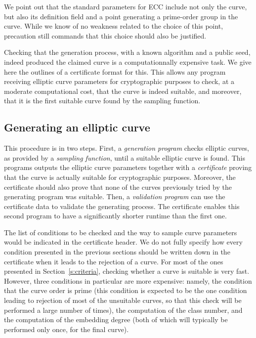 \documentclass[twocolumn,letterpaper,10pt]{article}
\begin{document}
We point out that the standard parameters for ECC
include not only the curve, but also its definition field
and a point generating a prime-order group in the curve.
While we know of no weakness related to the choice of this point,
precaution still commands that this choice should also be justified.


Checking that the generation process,
with a known algorithm and a public seed,
indeed produced the claimed curve
is a computationnally expensive task.
We give here the outlines of a certificate format for this.
This allows any program receiving elliptic curve parameters
for cryptographic purposes
to check, at a moderate computational cost,
that the curve is indeed suitable,
and moreover, that it is the first suitable curve
found by the sampling function.

\subsection{Generating an elliptic curve}

This procedure is in two steps.
First, a \emph{generation program}
checks elliptic curves, as provided by a \emph{sampling function},
until a suitable elliptic curve is found.
This programs outputs the elliptic curve parameters
together with a \emph{certificate} proving that
the curve is actually suitable for cryptographic purposes.
Moreover, the certificate should also prove that
none of the curves previously tried by the generating program
was suitable.
Then, a \emph{validation program} can use the certificate data
to validate the generating process.
The certificate enables this second program
to have a significantly shorter runtime than the first one.

The list of conditions to be checked and the way to sample
curve parameters would be indicated in the certificate header.
We do not fully specify how every condition presented
in the previous sections should be written down in the
certificate when it leads to the rejection of a curve.
For most of the ones presented in Section~\ref{s:criteria},
checking whether a curve is suitable is very fast.
However, three conditions in particular are more expensive:
namely, the condition that the curve order is prime
(this condition is expected to be the one condition
leading to rejection of most of the unsuitable curves,
so that this check will be performed a large number of times),
the computation of the class number,
and the computation of the embedding degree
(both of which will typically be performed only once, for the final curve).
\end{document}

